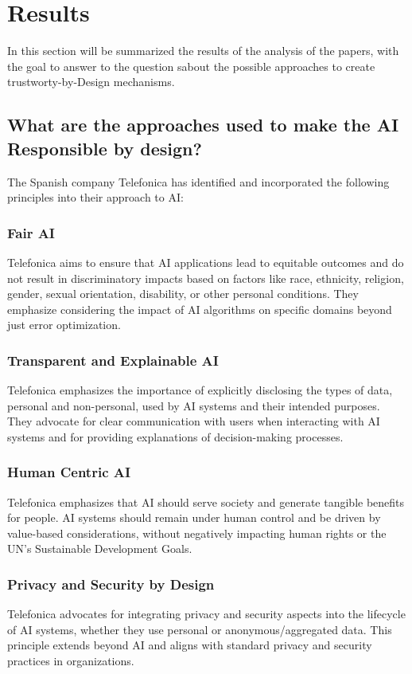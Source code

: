 \documentclass{article}
\begin{document}
\newpage
\section{Results}
In this section will be summarized the results of the analysis of the papers, with the goal to answer to the question sabout the possible approaches to create trustworty-by-Design mechanisms.

\subsection{What are the approaches used to make the AI Responsible by design?}
The Spanish company Telefonica has identified and incorporated the following principles into their approach to AI:

\subsubsection{Fair AI}
Telefonica aims to ensure that AI applications lead to equitable outcomes and do not result in discriminatory impacts based on factors like race, ethnicity, religion, gender, sexual orientation, disability, or other personal conditions. They emphasize considering the impact of AI algorithms on specific domains beyond just error optimization.

\subsubsection{Transparent and Explainable AI}
Telefonica emphasizes the importance of explicitly disclosing the types of data, personal and non-personal, used by AI systems and their intended purposes. They advocate for clear communication with users when interacting with AI systems and for providing explanations of decision-making processes.

\subsubsection{Human Centric AI}
Telefonica emphasizes that AI should serve society and generate tangible benefits for people. AI systems should remain under human control and be driven by value-based considerations, without negatively impacting human rights or the UN's Sustainable Development Goals.

\subsubsection{Privacy and Security by Design}
Telefonica advocates for integrating privacy and security aspects into the lifecycle of AI systems, whether they use personal or anonymous/aggregated data. This principle extends beyond AI and aligns with standard privacy and security practices in organizations.
\end{document}
